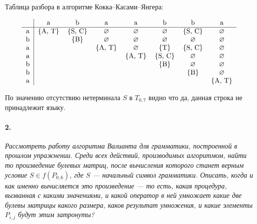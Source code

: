\documentclass[russian,table]{article}
\begin{document}
Таблица разбора в алгоритме Кокка–Касами–Янгера:

\begin{align*}
\begin{tabular}{c | c c c c c c c}
	~ & a & b & a & a & b & b & a \\
	\hline
	a & \{A, T\} & \{S, C\} & $\varnothing$ & $\varnothing$ & $\varnothing$ & \{S, C\} & $\varnothing$  \\
	b & ~ & \{B\} & $\varnothing$ & $\varnothing$ & $\varnothing$ & $\varnothing$ & $\varnothing$  \\
	a & ~ & ~ & \{A, T\} & $\varnothing$ & \{T\} &  \{S, C\} & $\varnothing$ \\
	a & ~ & ~ & ~ & \{A, T\} &  \{S, C\} & $\varnothing$ & $\varnothing$  \\
	b & ~ & ~ & ~ & ~ & \{B\} & $\varnothing$ & $\varnothing$  \\
	b & ~ & ~ & ~ & ~ & ~ & \{B\} & $\varnothing$  \\
	a & ~ & ~ & ~ & ~ & ~ & ~ & \{A, T\}  \\
\end{tabular}
\end{align*}

По значению отсутствию нетерминала $S$ в $T_{0, 7}$ видно что да, данная строка не принадлежит языку.

\pagebreak

\paragraph*{2.}

\textit{Рассмотреть работу алгоритма Валианта для грамматики, построенной в прошлом упражнении. Среди всех действий, производимых алгоритмом, найти то произведение булевых матриц, после вычисления которого станет верным условие $S \in f(P_{0,6})$, где $S$ — начальный символ грамматики. Описать, когда и как именно вычисляется это произведение — то есть, какая процедура, вызванная с какими значениями, и какой оператор в ней умножает какие две булевы матрицы какого размера, каков результат умножения, и какие элементы $P_{i,j}$ будут этим затронуты?}
\end{document}
